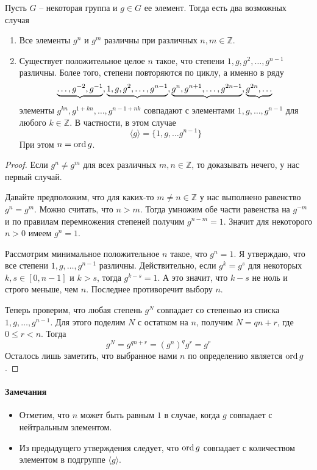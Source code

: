 \begin{claim}
\label{claim::CyclicClass}
Пусть $G$ -- некоторая группа и $g\in G$ ее элемент.
Тогда есть два возможных случая
\begin{enumerate}
\item Все элементы $g^n$ и $g^m$ различны при различных $n,m\in \mathbb Z$.

\item Существует положительное целое $n$ такое, что степени $1, g, g^2, \ldots, g^{n-1}$ различны.
Более того, степени повторяются по циклу, а именно в ряду
\[
\underbrace{\ldots, g^{-2},g^{-1}},\underbrace{1, g, g^2, \ldots, g^{n-1}}, \underbrace{g^n, g^{n+1},\ldots,g^{2n - 1}}, \underbrace{g^{2n},\ldots}\\
\]
элементы $g^{kn}, g^{1 + kn}, \ldots, g^{n-1 + nk}$ совпадают с элементами $1, g, \ldots, g^{n-1}$ для любого $k\in \mathbb Z$.
В частности, в этом случае
\[
\langle g\rangle =\{1,g,\ldots g^{n-1}\}
\]
При этом $n = \operatorname{ord} g$.
\end{enumerate}
\end{claim}
\begin{proof}
Если $g^n \neq g^m$ для всех различных $m, n\in \mathbb Z$, то доказывать нечего, у нас первый случай.

Давайте предположим, что для каких-то $m\neq n\in \mathbb Z$ у нас выполнено равенство $g^n = g^m$.
Можно считать, что $n > m$.
Тогда умножим обе части равенства на $g^{-m}$ и по правилам перемножения степеней получим $g^{n-m} = 1$.
Значит для некоторого $n > 0$ имеем $g^n = 1$.

Рассмотрим минимальное положительное $n$ такое, что $g^n = 1$.
Я утверждаю, что все степени $1, g, \ldots, g^{n-1}$ различны.
Действительно, если $g^k = g^s$ для некоторых $k,s \in [0, n-1]$ и $k > s$, тогда $g^{k-s} = 1$.
А это значит, что $k - s$ не ноль и строго меньше, чем $n$.
Последнее противоречит выбору $n$.

Теперь проверим, что любая степень $g^N$ совпадает со степенью из списка  $1, g, \ldots, g^{n-1}$.
Для этого поделим $N$ с остатком на $n$, получим $N = qn + r$, где $0 \leqslant r < n$.
Тогда
\[
g^N = g^{qn + r} = (g^n)^q g^r = g^r
\]
Осталось лишь заметить, что выбранное нами $n$ по определению является $\operatorname{ord} g$.
\end{proof}

\paragraph{Замечания}

\begin{itemize}
\item Отметим, что $n$ может быть равным $1$ в случае, когда $g$ совпадает с нейтральным элементом.

\item Из предыдущего утверждения следует, что $\operatorname{ord} g$ совпадает с количеством элементом в подгруппе $\langle g \rangle$.

\end{itemize}

